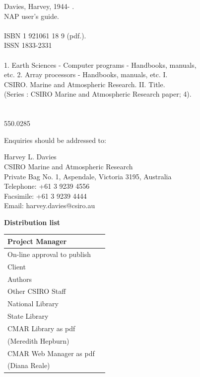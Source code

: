 {
\setlength{\parindent}{0mm}
\setlength{\parskip}{0.5\baselineskip}

{\large 
Davies, Harvey, 1944- . \\
NAP {\napversion} user's guide. \\
\\	
ISBN 1 921061 18 9 (pdf.). \\
ISSN 1833-2331 \\
\\	
1. Earth Sciences - Computer programs - Handbooks, manuals, \\
etc.  2. Array processors - Handbooks, manuals, etc.  I. \\
CSIRO. Marine and Atmospheric Research.  II. Title. \\
(Series : CSIRO Marine and Atmospheric Research paper; 4). \\
\\	
\\	
550.0285
}

\pagebreak

\newcommand{\sectionlabel}[1]{
    \vspace*{6mm}
    \textbf{\textsf{\Large #1}}
    \vspace*{3mm}
}

{\large 
Enquiries should be addressed to:

Harvey L. Davies\\
CSIRO Marine and Atmospheric Research\\
Private Bag No. 1, Aspendale, Victoria 3195, Australia\\
Telephone: +61 3 9239 4556\\
Facsimile:  +61 3 9239 4444\\
Email: harvey.davies@csiro.au
}
	
\sectionlabel{Distribution list}

\begin{tabular}{|l|l|}
    \hline
    Project Manager & \hspace{15mm} \\ \hline
    On-line approval to publish & \\ \hline
    Client & \\ \hline
    Authors & \\ \hline
    Other CSIRO Staff  & \\ \hline
    National Library  & \\ \hline
    State Library & \\ \hline
    CMAR Library as pdf & \\ 
    (Meredith Hepburn) & \\ \hline
    CMAR Web Manager  as pdf & \\
    (Diana Reale) & \\ \hline
\end{tabular}

}
